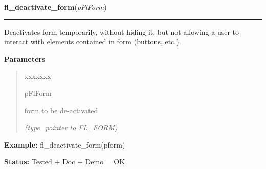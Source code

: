    \label{xformslib:flbasic:fl_deactivate_form}

    \vspace{0.5ex}

\hspace{.8\funcindent}\begin{boxedminipage}{\funcwidth}

    \raggedright \textbf{fl\_deactivate\_form}(\textit{pFlForm})

    \vspace{-1.5ex}

    \rule{\textwidth}{0.5\fboxrule}
\setlength{\parskip}{2ex}
    Deactivates form temporarily, without hiding it, but not allowing a 
    user to interact with elements contained in form (buttons, etc.).

\setlength{\parskip}{1ex}
      \textbf{Parameters}
      \vspace{-1ex}

      \begin{quote}
        \begin{Ventry}{xxxxxxx}

          \item[pFlForm]

          form to be de-activated

            {\it (type=pointer to FL\_FORM)}

        \end{Ventry}

      \end{quote}

\textbf{Example:} fl\_deactivate\_form(pform)



\textbf{Status:} Tested + Doc + Demo = OK



    \end{boxedminipage}

    \label{xformslib:flbasic:fl_activate_form}

    \vspace{0.5ex}

